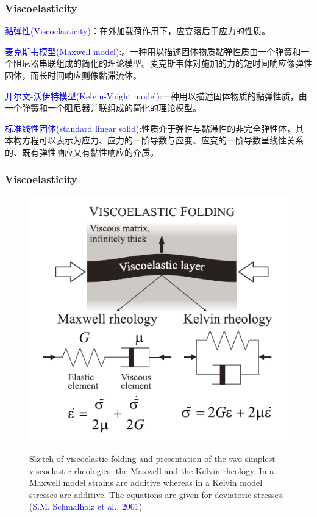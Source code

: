 ﻿\documentclass{beamer}
\begin{document}
\begin{frame}
\frametitle{Viscoelasticity}

\textcolor{blue}{黏弹性(Viscoelasticity)}：在外加载荷作用下，应变落后于应力的性质。

\textcolor{blue}{麦克斯韦模型(Maxwell model)}:。一种用以描述固体物质黏弹性质由一个弹簧和一个阻尼器串联组成的简化的理论模型。麦克斯韦体对施加的力的短时间响应像弹性固体，而长时间响应则像黏滞流体。

\textcolor{blue}{开尔文-沃伊特模型(Kelvin-Voight model)}:一种用以描述固体物质的黏弹性质，由一个弹簧和一个阻尼器并联组成的简化的理论模型。

\textcolor{blue}{标准线性固体(standard linear solid)}:性质介于弹性与黏滞性的非完全弹性体，其本构方程可以表示为应力、应力的一阶导数与应变、应变的一阶导数呈线性关系的、既有弹性响应又有黏性响应的介质。


\end{frame}


\begin{frame}
\frametitle{Viscoelasticity}


\begin{figure}
  \centering
  \includegraphics[scale=0.35]{./pic/viscoelastic.png}\\
  \caption{Sketch of viscoelastic folding and presentation of the
two simplest viscoelastic rheologies: the Maxwell and the Kelvin
rheology. In a Maxwell model strains are additive whereas in a
Kelvin model stresses are additive. The equations are given for
deviatoric stresses.(\textcolor{blue}{S.M. Schmalholz et al., 2001})}\label{fig_okada}
\end{figure}



\end{frame}
\end{document}
